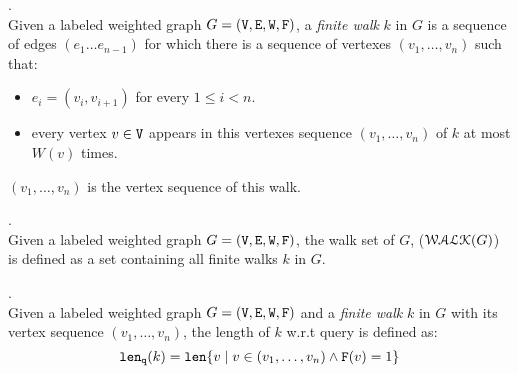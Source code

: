 \documentclass[a4paper,11pt]{article}
\begin{document}
\begin{defn}.
\\
Given a labeled weighted graph $G = (\mathtt{V}, \mathtt{E}, \mathtt{W}, \mathtt{F})$, a \emph{finite walk} $k$ in $G$ is a sequence of edges $(e_1 \ldots e_{n - 1})$ 
for which there is a sequence of vertexes $(v_1, \ldots, v_{n})$ such that:
\begin{itemize}
    \item $e_i = (v_{i},v_{i + 1})$ for every $1 \leq i < n$.
    \item every vertex $v \in \mathtt{V}$ appears in this vertexes sequence $(v_1, \ldots, v_{n})$ of $k$ at most $W(v)$ times.  
\end{itemize}
$(v_1, \ldots, v_{n})$ is the vertex sequence of this walk.
\end{defn}

\begin{defn}.
\\
Given a labeled weighted graph $G = (\mathtt{V}, \mathtt{E}, \mathtt{W}, \mathtt{F})$, the walk set of $G$, ($\mathcal{WALK}(G)$) is defined as a set containing all finite walks $k$ in $G$.
\end{defn}
%
%
\begin{defn}.
\\
Given a labeled weighted graph $G = (\mathtt{V}, \mathtt{E}, \mathtt{W}, \mathtt{F})$ and a \emph{finite walk} $k$ in $G$ with its vertex sequence $(v_1, \ldots, v_{n})$, the length of $k$ w.r.t query is defined as:
\[
	\mathtt{len}_{\tt q}(k) = \mathtt{len}\{ v \mid v \in (v_1, \ldots, v_{n}) \land \mathtt{F}(v) = 1 \}
\]
\end{defn}
\end{document}
